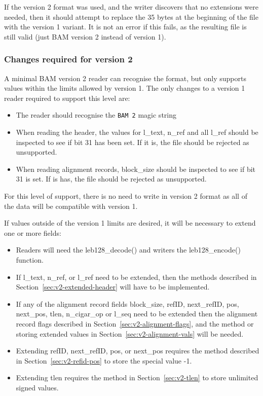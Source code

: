 \documentclass[10pt]{article}
\begin{document}
If the version 2 format was used, and the writer discovers that no extensions
were needed, then it should attempt to replace the 35 bytes at the beginning
of the file with the version 1 variant.
It is not an error if this fails, as the resulting file is still valid (just
BAM version 2 instead of version 1).

\subsubsection{Changes required for version 2}

A minimal BAM version 2 reader can recognise the format, but only supports
values within the limits allowed by version 1.  The only changes to a
version 1 reader required to support this level are:

\begin{itemize}
\item The reader should recognise the {\tt BAM 2} {\sf magic} string
\item When reading the header, the values for {\sf l\_text}, {\sf n\_ref} and
all {\sf l\_ref} should be inspected to see if bit 31 has been set.
If it is, the file should be rejected as unsupported.
\item When reading alignment records, {\sf block\_size} should be inspected
to see if bit 31 is set.  If is has, the file should be rejected as unsupported.
\end{itemize}

For this level of support, there is no need to write in version 2 format
as all of the data will be compatible with version 1.

If values outside of the version 1 limits are desired, it will be necessary
to extend one or more fields:

\begin{itemize}
\item Readers will need the {\sf leb128\_decode()} and writers the
{\sf leb128\_encode()} function.
\item If {\sf l\_text}, {\sf n\_ref}, or {\sf l\_ref} need to be extended, then
the methods described in Section~\ref{sec:v2-extended-header} will have to
be implemented.
\item If any of the alignment record fields {\sf block\_size}, {\sf refID},
{\sf next\_refID}, {\sf pos}, {\sf next\_pos}, {\sf tlen}, {\sf n\_cigar\_op}
or {\sf l\_seq} need to be extended then the alignment record flags
described in Section~\ref{sec:v2-alignment-flags}, and the method or storing
extended values in Section~\ref{sec:v2-alignment-vals} will be needed.
\item Extending {\sf refID}, {\sf next\_refID}, {\sf pos}, or {\sf next\_pos}
requires the  method described in Section~\ref{sec:v2-refid-pos} to store the
special value -1.
\item Extending {\sf tlen} requires the method in Section~\ref{sec:v2-tlen} to
store unlimited signed values.
\end{itemize}
\end{document}
